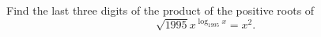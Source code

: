 Find the last three digits of the product of the positive roots of \[ \sqrt{1995}x^{\log_{1995}x}=x^2. \]
